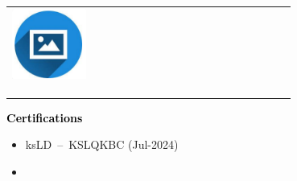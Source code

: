 \documentclass{article}
\begin{document}
\begin{paracol}{2}
 \begin{tabular}{@{}cp{0.7\linewidth}}
      \begin{minipage}{0.05\linewidth}
        \includegraphics[width=\linewidth]{picon.png}
      \end{minipage} & \vspace{-12pt}
      {\color{sidetext} } \\[-6pt]
      &  \\
      &  \\
      &  
    \end{tabular}

\vspace{0.5cm}

\textcolor{black}{\Large \textbf{Certifications}} \\

\begin{itemize}[leftmargin=12pt]
\item ksLD  \,–\, KSLQKBC (Jul-2024)
\item 
\end{itemize}


\end{paracol}
\end{document}
